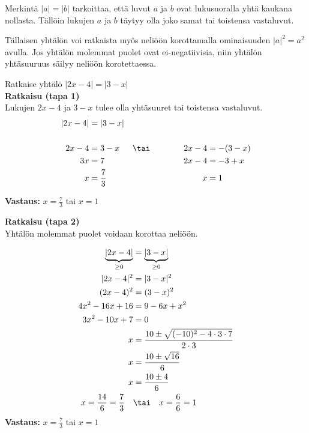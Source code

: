 Merkintä $|a|=|b|$ tarkoittaa, että luvut $a$ ja $b$ ovat lukusuoralla yhtä kaukana nollasta. Tällöin lukujen $a$ ja $b$ täytyy olla joko samat tai toistensa vastaluvut.


Tällaisen yhtälön voi ratkaista myös neliöön korottamalla ominaisuuden $|a|^2=a^2$ avulla. Jos yhtälön molemmat puolet ovat ei-negatiivisia, niin yhtälön yhtäsuuruus säilyy neliöön korotettaessa.


\begin{esimerkki}
	Ratkaise yhtälö $|2x-4|=|3-x|$ \\
	\textbf{Ratkaisu (tapa 1)} \\
	Lukujen $2x-4$ ja $3-x$ tulee olla yhtäsuuret tai toistensa vastaluvut.
	\begin{align*}
		|2x-4|&=|3-x|  &\quad   &\ \ \\
		&\quad \  &\quad \ &\quad \ \\
		2x-4&=3-x  &\tai \qquad \qquad 2x-4&=-(3-x) \\
		3x&=7 \quad   &\quad     2x-4&=-3+x \\
		x&=\frac{7}{3} \quad  &\quad    x&=1
	\end{align*}

	\textbf{Vastaus: } $x=\frac{7}{3}$ \quad tai \quad $x=1$

	\textbf{Ratkaisu (tapa 2)} \\
	Yhtälön molemmat puolet voidaan korottaa neliöön.
				
	\begin{align*}
		\underbrace{|2x-4|}_{\geq0} &= \underbrace{|3-x|}_{\geq0}    \\
		|2x-4|^2 &= |3-x|^2   \\
		(2x-4)^2 &= (3-x)^2   \\
		4x^2-16x+16 &= 9 -6x + x^2   \\
		3x^2-10x+7 &= 0   \\
		x &= \frac{10\pm\sqrt{(-10)^2-4\cdot 3\cdot 7}}{2\cdot 3}   \\
		x &= \frac{10\pm\sqrt{16}}{6}   \\		
		x &= \frac{10\pm4}{6}     \\
		x=\frac{14}{6}=\frac{7}{3} \quad  &\tai \quad x=\frac{6}{6}=1 \\
	\end{align*}
	\textbf{Vastaus: } $x=\frac{7}{3}$ \quad tai \quad $x=1$

\end{esimerkki} 

